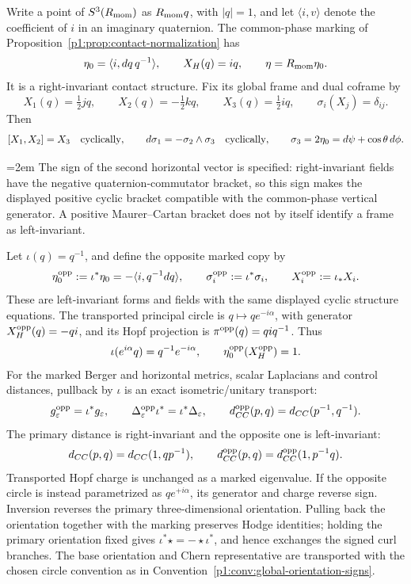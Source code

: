 \documentclass[11pt]{article}
\begin{document}
\begin{proposition}
\label{p1:prop:marked-hopf-inversion-transport}
Write a point of \(S^3(R_{\mathrm{mom}})\) as \(R_{\mathrm{mom}} q\), with \(|q|=1\), and
let \(\langle i,v\rangle\) denote the coefficient of \(i\) in an imaginary
quaternion.  The common-phase marking of
Proposition~\ref{p1:prop:contact-normalization} has
\[
 \eta_0=\langle i,dq\,q^{-1}\rangle,\qquad X_H(q)=iq,
 \qquad \eta=R_{\mathrm{mom}}\eta_0.
\]
It is a right-invariant contact structure.  Fix its global frame and dual
coframe by
\[
 X_1(q)=\tfrac12jq,\qquad X_2(q)=-\tfrac12kq,\qquad
 X_3(q)=\tfrac12iq,\qquad \sigma_i(X_j)=\delta_{ij}.
\]
Then
\[
 [X_1,X_2]=X_3\quad\hbox{cyclically},\qquad
 d\sigma_1=-\sigma_2\wedge\sigma_3\quad\hbox{cyclically},\qquad
 \sigma_3=2\eta_0=d\psi+\cos\theta\,d\phi.
\]
{\emergencystretch=2em
The sign of the second horizontal vector is specified: right-invariant
fields have the negative quaternion-commutator bracket, so this sign makes
the displayed positive cyclic bracket compatible with the common-phase
vertical generator.  A positive Maurer--Cartan bracket does not by itself
identify a frame as left-invariant.\par}

Let \(\iota(q)=q^{-1}\), and define the opposite marked copy by
\[
 \eta_0^{\rm opp}:=\iota^*\eta_0
   =-\langle i,q^{-1}dq\rangle,\qquad
 \sigma_i^{\rm opp}:=\iota^*\sigma_i,\qquad
 X_i^{\rm opp}:=\iota_*X_i.
\]
These are left-invariant forms and fields with the same displayed cyclic
structure equations.  The transported principal circle is
\(q\mapsto q e^{-i\alpha}\), with generator
\(X_H^{\rm opp}(q)=-qi\), and its Hopf projection is
\(\pi^{\rm opp}(q)=qiq^{-1}\).  Thus
\[
 \iota(e^{i\alpha}q)=q^{-1}e^{-i\alpha},\qquad
 \eta_0^{\rm opp}(X_H^{\rm opp})=1.
\]
For the marked Berger and horizontal metrics, scalar Laplacians and control
distances, pullback by \(\iota\) is an exact isometric/unitary transport:
\[
 g_\varepsilon^{\rm opp}=\iota^*g_\varepsilon,\qquad
 \Delta_\varepsilon^{\rm opp}\iota^*=\iota^*\Delta_\varepsilon,\qquad
 d_{CC}^{\rm opp}(p,q)=d_{CC}(p^{-1},q^{-1}).
\]
The primary distance is right-invariant and the opposite one is
left-invariant:
\[
 d_{CC}(p,q)=d_{CC}(1,qp^{-1}),\qquad
 d_{CC}^{\rm opp}(p,q)=d_{CC}^{\rm opp}(1,p^{-1}q).
\]
Transported Hopf charge is unchanged as a marked eigenvalue.  If the
opposite circle is instead parametrized as \(q e^{+i\alpha}\), its
generator and charge reverse sign.  Inversion reverses the primary
three-dimensional orientation.  Pulling back the orientation together with
the marking preserves Hodge identities; holding the primary orientation
fixed gives \(\iota^*\star=-\star\iota^*\), and hence exchanges the signed
curl branches.  The base orientation and Chern representative are transported
with the chosen circle convention as in
Convention~\ref{p1:conv:global-orientation-signs}.
\end{proposition}
\end{document}
